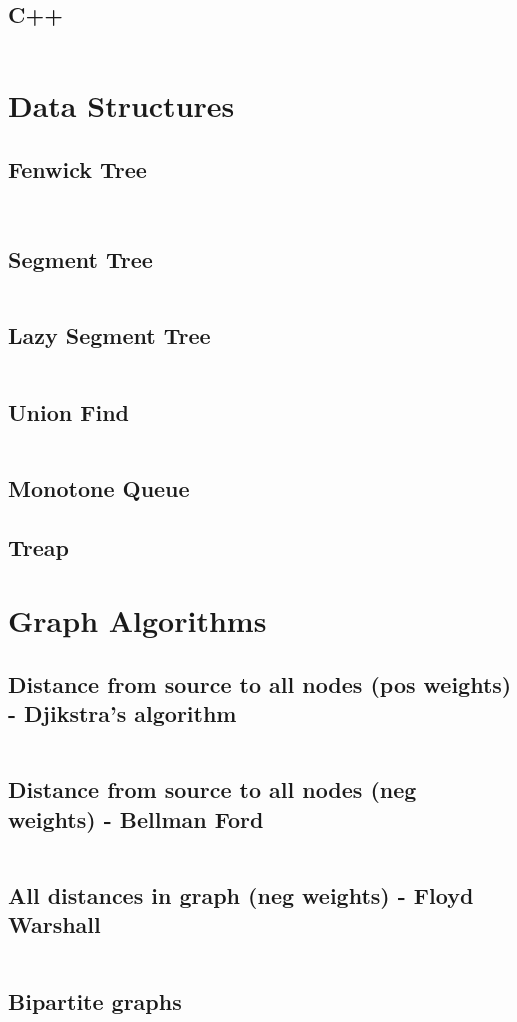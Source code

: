 \documentclass[8pt,a4paper,landscape,oneside]{amsart}
\newcommand{\codej}[1]{\inputminted[fontsize=\large,tabsize=2,baselinestretch=1]{java}{#1}}
\newcommand{\codec}[1]{\inputminted[fontsize=\large,tabsize=2,baselinestretch=1]{cpp}{#1}}
\newcommand{\codep}[1]{\inputminted[fontsize=\large,tabsize=2,baselinestretch=1]{py}{#1}}
\begin{document}
\begin{multicols*}{2}
\begin{large}
\subsection{C++}
\codec{template.cpp}
\section{Data Structures}
\subsection{Fenwick Tree}
\codep{fenwicktree.py}
\codej{fenwicktree.java}
\subsection{Segment Tree}
\codep{sgmtree.cpp}
\subsection{Lazy Segment Tree}
\codec{lazysgmtree.cpp}
\subsection{Union Find}
\codep{unionfind.py}
\subsection{Monotone Queue}
\subsection{Treap}
\section{Graph Algorithms}
\subsection{Distance from source to all nodes (pos weights) - Djikstra's algorithm}
\codep{djikstra.py}
\subsection{Distance from source to all nodes (neg weights) - Bellman Ford}
\codep{bellmanford.py}
\subsection{All distances in graph (neg weights) - Floyd Warshall}
\codep{floydwarshall.py}
\subsection{Bipartite graphs}

\end{large}
\end{multicols*}
\end{document}
